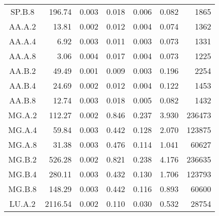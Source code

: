 \begin{ThreePartTable}
\begin{longtable}[c]{c*{6}{r}}
        SP.B.8                 & 196.74                              & 0.003                               & 0.018          & 0.006 & 0.082 & 1865   \\
        AA.A.2                 & 13.81                               & 0.002                               & 0.012          & 0.004 & 0.074 & 1362   \\
        AA.A.4                 & 6.92                                & 0.003                               & 0.011          & 0.003 & 0.073 & 1331   \\
        AA.A.8                 & 3.06                                & 0.004                               & 0.017          & 0.004 & 0.073 & 1225   \\
        AA.B.2                 & 49.49                               & 0.001                               & 0.009          & 0.003 & 0.196 & 2254   \\
        AA.B.4                 & 24.69                               & 0.002                               & 0.012          & 0.004 & 0.122 & 1453   \\
        AA.B.8                 & 12.74                               & 0.003                               & 0.018          & 0.005 & 0.082 & 1432   \\
        MG.A.2                 & 112.27                              & 0.002                               & 0.846          & 0.237 & 3.930 & 236473 \\
        MG.A.4                 & 59.84                               & 0.003                               & 0.442          & 0.128 & 2.070 & 123875 \\
        MG.A.8                 & 31.38                               & 0.003                               & 0.476          & 0.114 & 1.041 & 60627  \\
        MG.B.2                 & 526.28                              & 0.002                               & 0.821          & 0.238 & 4.176 & 236635 \\
        MG.B.4                 & 280.11                              & 0.003                               & 0.432          & 0.130 & 1.706 & 123793 \\
        MG.B.8                 & 148.29                              & 0.003                               & 0.442          & 0.116 & 0.893 & 60600  \\
        LU.A.2                 & 2116.54                             & 0.002                               & 0.110          & 0.030 & 0.532 & 28754  \\

\end{longtable}
\end{ThreePartTable}
